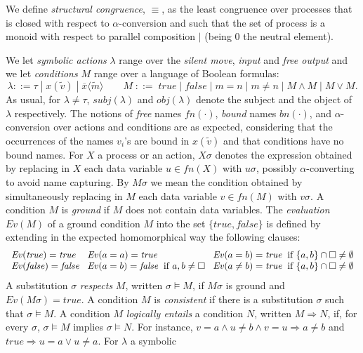 \documentclass[submission,copyright,creativecommons]{eptcs}
\newcommand{\opaque}{\square}
\newcommand{\outp}[2]{\overline{#1}\langle{#2}\rangle}
\newcommand{\inp}[2]{#1(#2)}
\newcommand{\fn}{\mathit{fn}}
\newcommand{\bn}{\mathit{bn}}
\newcommand{\tuple}[1]{\widetilde{#1}}
\newcommand{\act}{\lambda}
\newcommand{\true}{\mathit{true}}
\newcommand{\false}{\mathit{false}}
\newcommand{\Ev}{\mathit{Ev}}
\newcommand{\subj}{\mathit{subj}}
\newcommand{\obj}{\mathit{obj}}
\begin{document}
We define {\em structural congruence}, $\equiv$, as the least
congruence over processes that is closed with respect to $\alpha$-conversion 
and such that the set of process is a monoid with respect to parallel 
composition $|$ (being $0$ the neutral element). 

We let {\em symbolic actions} $\act$ range over the {\em silent move}, 
{\em input} and {\em free output} and we let {\em conditions} $M$ range 
over a language of Boolean formulas:
\[
  \act ::= \tau \;|\; \inp x {\tuple v} \;|\;\outp x {\tuple m}
 \qquad 
  M \; ::= \; \true \;|\; \false \;|\; m = n \;|\; m \neq n \;|\; 
  M \wedge M \;|\; M \vee M.  
\]
As usual, for $\act \neq \tau$, $\subj(\act)$ and $\obj(\act)$ 
denote the subject and the object of $\act$ respectively.  
The notions of {\it free} names $\fn(\cdot)$, {\it bound} names $\bn(\cdot)$,
and $\alpha$-conversion over actions and conditions are as expected,
considering that the occurrences of the names $v_i$'s are bound in
$\inp x {\tuple v}$ and that conditions have no bound names.
For $X$ a process or an action, $X\sigma$ denotes the expression obtained
by replacing in $X$ each data variable $u \in \fn(X)$ with $u \sigma$, 
possibly $\alpha$-converting to avoid name capturing.
By $M \sigma$ we mean the condition obtained by simultaneously
replacing in $M$ each data variable $v \in fn(M)$ with $v \sigma$.  A
condition $M$ is {\em ground} if $M$ does not contain data variables.
The {\em evaluation} $\Ev(M)$ of a ground condition $M$ into the set
$\{ \true, \false \}$ is defined by extending in the expected
homomorphical way the following clauses:
\[
 \begin{array}{l@{\;\;\;}l@{\;\;\;}l}
  \Ev(\true) = \true & \Ev(a=a) = \true & \Ev(a=b)= \true \;\; \mbox{if $\{ a,b\} \cap {\opaque} 
  \neq \emptyset$} \\
  \Ev(\false) = \false & \Ev(a=b) = \false \;\; \mbox{if $a,b \neq \opaque$} 
  & \Ev(a \neq b)= \true \;\; \mbox{if $\{ a,b\} \cap {\opaque} 
  \neq \emptyset$}
 \end{array}
\]
A substitution $\sigma$ {\em respects} $M$, written $\sigma \models
M$, if $M\sigma$ is ground and $\Ev(M\sigma)=\true$. A condition $M$
is \emph{consistent} if there is a substitution $\sigma$ such that
$\sigma \models M$.  A condition $M$ {\em logically entails} a
condition $N$, written $M \Rightarrow N$, if, for every $\sigma$,
$\sigma \models M$ implies $\sigma \models N$.  
For instance, $v = a \wedge u \neq b \wedge v = u \Rightarrow a \neq b$ 
and $\true \Rightarrow u = a \vee u \neq a$.  For $\lambda$ a symbolic 
\end{document}
